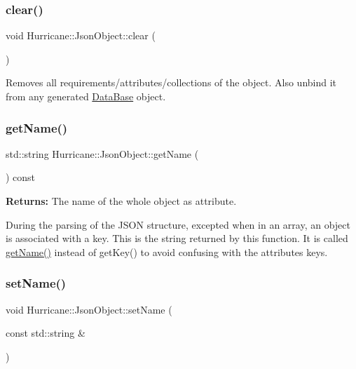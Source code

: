 \subsubsection{\texorpdfstring{clear()}{clear()}}
{\footnotesize\ttfamily void Hurricane\+::\+Json\+Object\+::clear (\begin{DoxyParamCaption}{ }\end{DoxyParamCaption})\hspace{0.3cm}{\ttfamily [inline]}}

Removes all requirements/attributes/collections of the object. Also unbind it from any generated \mbox{\hyperlink{classHurricane_1_1DataBase}{Data\+Base}} object. \mbox{\label{classHurricane_1_1JsonObject_aa4d6d0502f0f25e614ef50ac3dd76263}} 
\subsubsection{\texorpdfstring{get\+Name()}{getName()}}
{\footnotesize\ttfamily std\+::string Hurricane\+::\+Json\+Object\+::get\+Name (\begin{DoxyParamCaption}{ }\end{DoxyParamCaption}) const\hspace{0.3cm}{\ttfamily [inline]}}

{\bfseries Returns\+:} The name of the whole object as attribute.

During the parsing of the J\+S\+ON structure, excepted when in an array, an object is associated with a key. This is the string returned by this function. It is called {\ttfamily \mbox{\hyperlink{classHurricane_1_1JsonObject_aa4d6d0502f0f25e614ef50ac3dd76263}{get\+Name()}}} instead of {\ttfamily get\+Key()} to avoid confusing with the attributes keys. \mbox{\label{classHurricane_1_1JsonObject_aeda98a478720cf29e532e2a11f6f54c5}} 
\subsubsection{\texorpdfstring{set\+Name()}{setName()}}
{\footnotesize\ttfamily void Hurricane\+::\+Json\+Object\+::set\+Name (\begin{DoxyParamCaption}\item[{const std\+::string \&}]{ }\end{DoxyParamCaption})\hspace{0.3cm}{\ttfamily [inline]}}


